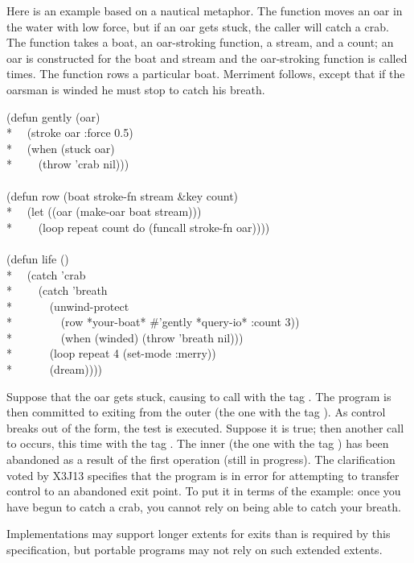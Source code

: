 \begin{defspec}
\begin{newer}
Here is an example based on a nautical metaphor.  The function 
moves an oar in the water with low force, but if an oar gets stuck, the caller
will catch a crab.  The function 
takes a boat, an oar-stroking function,
a stream, and a count; an oar is constructed for the boat and stream
and the oar-stroking function is called  times.
The function  rows a particular boat.
Merriment follows, except that if the oarsman is winded he must stop
to catch his breath.
\begin{lisp}
(defun gently (oar) \\*
~~(stroke oar :force 0.5) \\*
~~(when (stuck oar) \\*
~~~~(throw 'crab nil))) \\
\\
(defun row (boat stroke-fn stream \&key count) \\*
~~(let ((oar (make-oar boat stream))) \\*
~~~~(loop repeat count do (funcall stroke-fn oar)))) \\
\\
(defun life () \\*
~~(catch 'crab \\*
~~~~(catch 'breath \\*
~~~~~~(unwind-protect \\*
~~~~~~~~(row *your-boat* \#'gently *query-io* :count 3)) \\*
~~~~~~~~(when (winded) (throw 'breath nil))) \\*
~~~~~~(loop repeat 4 (set-mode :merry)) \\*
~~~~~~(dream))))
\end{lisp}
Suppose that the oar gets stuck, causing  to call 
with the tag .
The program is then committed to exiting from the outer  (the one
with the tag ).  As control breaks out of the  form,
the  test is executed.  Suppose it is true; then another call to 
occurs, this time with the tag .  The inner  (the one with
the tag ) has been abandoned as a result of the first
 operation (still in progress).  The clarification voted by X3J13
specifies that the program is in error for attempting to transfer control
to an abandoned exit point.  To put it in terms of the example: once you have
begun to catch
a crab, you cannot rely on being able to catch your breath.

Implementations may support longer extents for exits than is
required by this specification,
but portable programs may not rely on such extended extents.


\end{newer}
\end{defspec}
